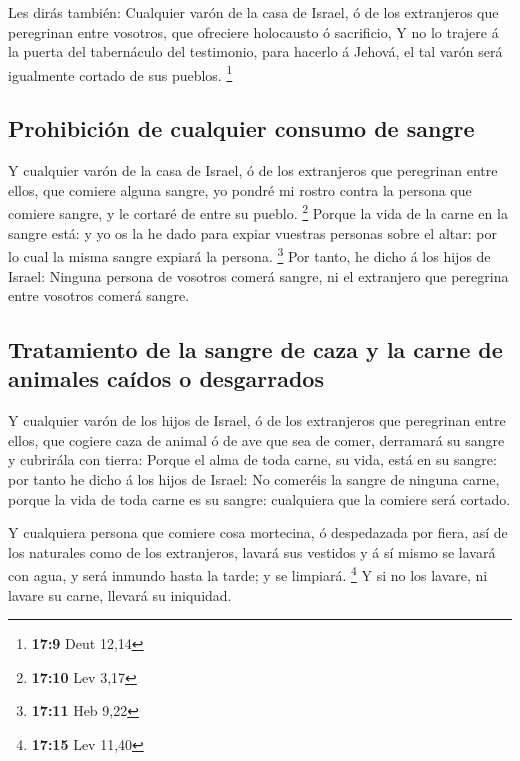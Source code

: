  Les dirás también: Cualquier varón de la casa de Israel,
ó de los extranjeros que peregrinan entre vosotros, que ofreciere
holocausto ó sacrificio,  Y no lo trajere á la puerta del
tabernáculo del testimonio, para hacerlo á Jehová, el tal varón será
igualmente cortado de sus pueblos. \footnote{\textbf{17:9} Deut 12,14}

\hypertarget{prohibiciuxf3n-de-cualquier-consumo-de-sangre}{%
\subsection{Prohibición de cualquier consumo de
sangre}\label{prohibiciuxf3n-de-cualquier-consumo-de-sangre}}

 Y cualquier varón de la casa de Israel, ó de los
extranjeros que peregrinan entre ellos, que comiere alguna sangre, yo
pondré mi rostro contra la persona que comiere sangre, y le cortaré de
entre su pueblo. \footnote{\textbf{17:10} Lev 3,17} 
Porque la vida de la carne en la sangre está: y yo os la he dado para
expiar vuestras personas sobre el altar: por lo cual la misma sangre
expiará la persona. \footnote{\textbf{17:11} Heb 9,22} 
Por tanto, he dicho á los hijos de Israel: Ninguna persona de vosotros
comerá sangre, ni el extranjero que peregrina entre vosotros comerá
sangre.

\hypertarget{tratamiento-de-la-sangre-de-caza-y-la-carne-de-animales-cauxeddos-o-desgarrados}{%
\subsection{Tratamiento de la sangre de caza y la carne de animales
caídos o
desgarrados}\label{tratamiento-de-la-sangre-de-caza-y-la-carne-de-animales-cauxeddos-o-desgarrados}}

 Y cualquier varón de los hijos de Israel, ó de los
extranjeros que peregrinan entre ellos, que cogiere caza de animal ó de
ave que sea de comer, derramará su sangre y cubrirála con tierra:
 Porque el alma de toda carne, su vida, está en su
sangre: por tanto he dicho á los hijos de Israel: No comeréis la sangre
de ninguna carne, porque la vida de toda carne es su sangre: cualquiera
que la comiere será cortado.

 Y cualquiera persona que comiere cosa mortecina, ó
despedazada por fiera, así de los naturales como de los extranjeros,
lavará sus vestidos y á sí mismo se lavará con agua, y será inmundo
hasta la tarde; y se limpiará. \footnote{\textbf{17:15} Lev 11,40}
 Y si no los lavare, ni lavare su carne, llevará su
iniquidad.

